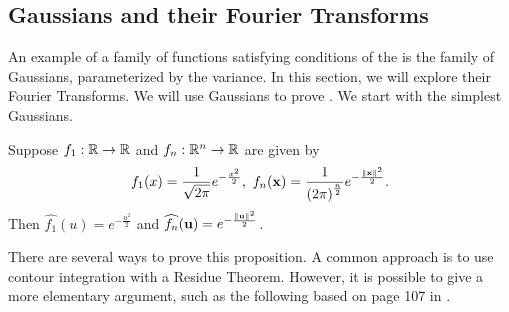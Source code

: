 \subsection{Gaussians and their Fourier Transforms}
An example of a family of functions satisfying conditions of the  is the family of Gaussians, parameterized by the variance. In this section, we will explore their Fourier Transforms. We will use Gaussians to prove . We start with the simplest Gaussians.
\begin{proposition}
\label{prop:fourier:gaussian:ft}
Suppose $f_1 : {\mathbb R} \to {\mathbb R}$ and $f_n : {\mathbb R}^n \to {\mathbb R}$ are given by 
\begin{align*}
        f_1 (x) = \frac{1}{\sqrt{2 \pi}} e^{-\frac{x^2}{2}}, \text{ }  f_n (\mathbf{x}) = \frac{1}{\left ( 2 \pi \right )^\frac{n}{2}} e^{-\frac{\left\lVert\mathbf{x}\right\rVert^2}{2}}.
\end{align*}
Then  $\widehat{f_1}(u) = e^{-\frac{u^2}{2}}$ and  $\widehat{f_n}(\mathbf{u}) = e^{-\frac{\left\lVert\mathbf{u}\right\rVert^2}{2}}$.
\end{proposition}
\begin{proof-idea*}
There are several ways to prove this proposition. A common approach is to use contour integration with a Residue Theorem.
However, it is possible to give a more elementary argument, such as the following based on page 107 in \cite{jacod_2004_probability} . 
\end{proof-idea*}
